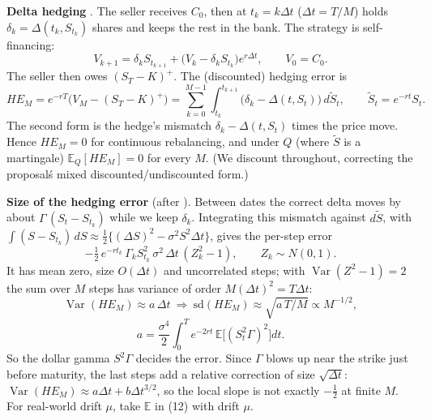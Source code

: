 \documentclass[10pt,a4paper]{article}
\newcommand{\E}{\mathbb{E}}\newcommand{\Var}{\operatorname{Var}}\newcommand{\Cov}{\operatorname{Cov}}
\begin{document}
\textbf{Delta hedging} \cite{bs,sh}. The seller receives $C_0$, then at $t_k=k\Delta t$ ($\Delta t=T/M$) holds $\delta_k=\Delta(t_k,S_{t_k})$ shares and keeps the rest in the bank. The strategy is self-financing:
\begin{equation}V_{k+1}=\delta_kS_{t_{k+1}}+\big(V_k-\delta_kS_{t_k}\big)e^{r\Delta t},\qquad V_0=C_0.\end{equation}
The seller then owes $(S_T-K)^+$. The (discounted) hedging error is
\begin{equation}HE_M=e^{-rT}\big(V_M-(S_T-K)^+\big)=\sum_{k=0}^{M-1}\int_{t_k}^{t_{k+1}}\big(\delta_k-\Delta(t,S_t)\big)\,d\tilde S_t,\qquad\tilde S_t=e^{-rt}S_t.\end{equation}
The second form is the hedge's mismatch $\delta_k-\Delta(t,S_t)$ times the price move. Hence $HE_M=0$ for continuous rebalancing, and under $Q$ (where $\tilde S$ is a martingale) $\E_Q[HE_M]=0$ for every $M$. (We discount throughout, correcting the proposal\'s mixed discounted/undiscounted form.)

\textbf{Size of the hedging error} (after \cite{be,bkl}). Between dates the correct delta moves by about $\Gamma\,(S_t-S_{t_k})$ while we keep $\delta_k$. Integrating this mismatch against $d\tilde S$, with $\int(S-S_{t_k})\,dS\approx\tfrac12\{(\Delta S)^2-\sigma^2S^2\Delta t\}$, gives the per-step error
\begin{equation}-\tfrac12\,e^{-rt_k}\,\Gamma_kS_{t_k}^2\,\sigma^2\,\Delta t\,(Z_k^2-1),\qquad Z_k\sim N(0,1).\end{equation}
It has mean zero, size $O(\Delta t)$ and uncorrelated steps; with $\Var(Z^2-1)=2$ the sum over $M$ steps has variance of order $M(\Delta t)^2=T\Delta t$:
\begin{equation}\Var(HE_M)\approx a\,\Delta t\ \Longrightarrow\ \mathrm{sd}(HE_M)\approx\sqrt{a\,T/M}\propto M^{-1/2},\end{equation}
\begin{equation}a=\frac{\sigma^4}{2}\int_0^Te^{-2rt}\,\E\big[(S_t^2\Gamma)^2\big]dt.\end{equation}
So the dollar gamma $S^2\Gamma$ decides the error. Since $\Gamma$ blows up near the strike just before maturity, the last steps add a relative correction of size $\sqrt{\Delta t}$: $\Var(HE_M)\approx a\Delta t+b\Delta t^{3/2}$, so the local slope is not exactly $-\tfrac12$ at finite $M$. For real-world drift $\mu$, take $\E$ in (12) with drift $\mu$.
\end{document}
